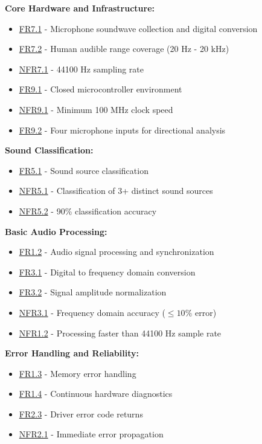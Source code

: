 \documentclass[12pt]{article}
\theoremstyle{definition}
\begin{document}
\textbf{Core Hardware and Infrastructure:}
\begin{itemize}
    \item \hyperref[FR7_1]{FR7.1} - Microphone soundwave collection and digital conversion
    \item \hyperref[FR7_2]{FR7.2} - Human audible range coverage (20 Hz - 20 kHz)
    \item \hyperref[NFR7_1]{NFR7.1} - 44100 Hz sampling rate
    \item \hyperref[FR9_1]{FR9.1} - Closed microcontroller environment
    \item \hyperref[NFR9_1]{NFR9.1} - Minimum 100 MHz clock speed
    \item \hyperref[FR9_2]{FR9.2} - Four microphone inputs for directional analysis
\end{itemize}

\textbf{Sound Classification:}
\begin{itemize}
    \item \hyperref[FR5_1]{FR5.1} - Sound source classification
    \item \hyperref[NFR5_1]{NFR5.1} - Classification of 3+ distinct sound sources
    \item \hyperref[NFR5_2]{NFR5.2} - 90\% classification accuracy
\end{itemize}

\textbf{Basic Audio Processing:}
\begin{itemize}
    \item \hyperref[FR1_2]{FR1.2} - Audio signal processing and synchronization
    \item \hyperref[FR3_1]{FR3.1} - Digital to frequency domain conversion
    \item \hyperref[FR3_2]{FR3.2} - Signal amplitude normalization
    \item \hyperref[NFR3_1]{NFR3.1} - Frequency domain accuracy ($\le 10\%$ error)
    \item \hyperref[NFR1_2]{NFR1.2} - Processing faster than 44100 Hz sample rate
\end{itemize}

\textbf{Error Handling and Reliability:}
\begin{itemize}
    \item \hyperref[FR1_3]{FR1.3} - Memory error handling
    \item \hyperref[FR1_4]{FR1.4} - Continuous hardware diagnostics
    \item \hyperref[FR2_3]{FR2.3} - Driver error code returns
    \item \hyperref[NFR2_1]{NFR2.1} - Immediate error propagation
\end{itemize}
\end{document}
